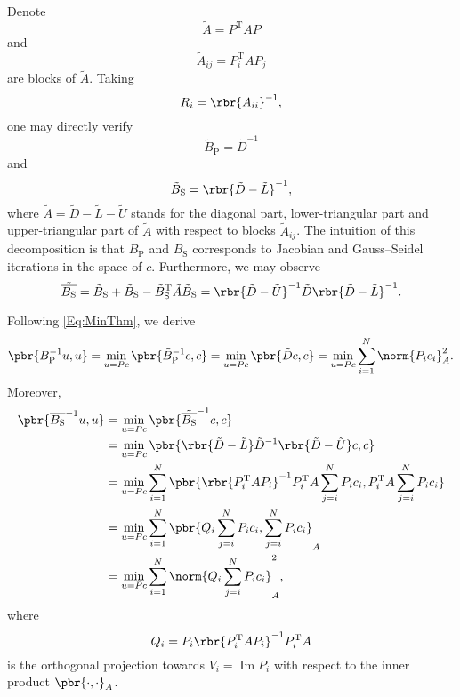 \documentclass[english, nochinese]{pnote}
\DeclareMathOperator\opim{\mathrm{Im}}
\begin{document}
Denote
\begin{equation}
\tilde{A} = P^{\text{T}} A P
\end{equation}
and
\begin{equation}
\tilde{A}_{ i j } = P_i^{\text{T}} A P_j
\end{equation}
are blocks of $\tilde{A}$. Taking
\begin{equation}
R_i = \rbr{A_{ i i }}^{-1},
\end{equation}
one may directly verify
\begin{equation}
\tilde{B}_{\text{P}} = \tilde{D}^{-1}
\end{equation}
and
\begin{equation}
\tilde{B}_{\text{S}} = \rbr{ \tilde{D} - \tilde{L} }^{-1},
\end{equation}
where $ \tilde{A} = \tilde{D} - \tilde{L} - \tilde{U} $ stands for the diagonal part, lower-triangular part and upper-triangular part of $\tilde{A}$ with respect to blocks $ \tilde{A}_{ i j } $. The intuition of this decomposition is that $B_{\text{P}}$ and $B_{\text{S}}$ corresponds to Jacobian and Gauss--Seidel iterations in the space of $c$. Furthermore, we may observe
\begin{equation}
\tilde{\overline{B_{\text{S}}}} = \tilde{B}_{\text{S}} + \tilde{B}_{\text{S}} - \tilde{B}_{\text{S}}^{\text{T}} \tilde{A} \tilde{B}_{\text{S}} = \rbr{ \tilde{D} - \tilde{U} }^{-1} \tilde{D} \rbr{ \tilde{D} - \tilde{L} }^{-1}.
\end{equation}

Following \eqref{Eq:MinThm}, we derive
\begin{equation} \label{Eq:EqP}
\pbr{ B_{\text{P}}^{-1} u, u } = \min_{ u = P c } \pbr{ \tilde{B}_{\text{P}}^{-1} c, c } = \min_{ u = P c } \pbr{ \tilde{D} c, c } = \min_{ u = P c } \sum_{ i = 1 }^N \norm{ P_i c_i }_A^2.
\end{equation}
Moreover,
\begin{equation} \label{Eq:EqS}
\begin{split}
\pbr{ \overline{B_{\text{S}}}^{-1} u, u } &= \min_{ u = P c } \pbr{ \tilde{\overline{B_{\text{S}}}}^{-1} c, c } \\
&= \min_{ u = P c } \pbr{ \rbr{ \tilde{D} - \tilde{L} } \tilde{D}^{-1} \rbr{ \tilde{D} - \tilde{U} } c, c } \\
&= \min_{ u = P c } \sum_{ i = 1 }^N \pbr{ \rbr{ P_i^{\text{T}} A P_i }^{-1} P_i^{\text{T}} A \sum_{ j = i }^N P_i c_i, P_i^{\text{T}} A \sum_{ j = i }^N P_i c_i } \\
&= \min_{ u = P c } \sum_{ i = 1 }^N \pbr{ Q_i \sum_{ j = i }^N P_i c_i, \sum_{ j = i }^N P_i c_i }_A \\
&= \min_{ u = P c } \sum_{ i = 1 }^N \norm{ Q_i \sum_{ j = i }^N P_i c_i }_A^2,
\end{split}
\end{equation}
where
\begin{equation}
Q_i = P_i \rbr{ P_i^{\text{T}} A P_i }^{-1} P_i^{\text{T}} A
\end{equation}
is the orthogonal projection towards $ V_i = \opim P_i $ with respect to the inner product $ \pbr{ \cdot, \cdot }_A $.
\end{document}
